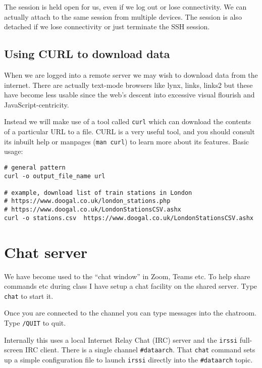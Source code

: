 The session is held open for us, even if we log out or lose connectivity.
We can actually attach to the same session from multiple devices.
The session is also detached if we lose connectivity or just terminate the SSH session.

\subsection{Using CURL to download data}
\label{using-curl-to-download-data}

When we are logged into a remote server we may wish to download data
from the internet. There are actually text-mode browsers like lynx,
links, links2 but these have become less usable since the web's descent
into excessive visual flourish and JavaScript-centricity.

Instead we will make use of a tool called \texttt{curl} which can
download the contents of a particular URL to a file. CURL is a very
useful tool, and you should consult its inbuilt help or manpages
(\texttt{man\ curl}) to learn more about its features. Basic usage:

\begin{verbatim}
# general pattern
curl -o output_file_name url

# example, download list of train stations in London
# https://www.doogal.co.uk/london_stations.php
# https://www.doogal.co.uk/LondonStationsCSV.ashx
curl -o stations.csv  https://www.doogal.co.uk/LondonStationsCSV.ashx
\end{verbatim}

\section{Chat server}

We have become used to the ``chat window'' in Zoom, Teams etc.
To help share commands etc during class I have setup a chat facility on the shared server.
Type \texttt{chat} to start it.

Once you are connected to the channel you can type messages into the chatroom.
Type \texttt{/QUIT} to quit.

Internally this uses a local Internet Relay Chat (IRC) server and the \texttt{irssi} full-screen IRC client.
There is a single channel \texttt{\#dataarch}. 
That \texttt{chat} command sets up a simple configuration file to launch \texttt{irssi} directly into the \texttt{\#dataarch} topic. 



